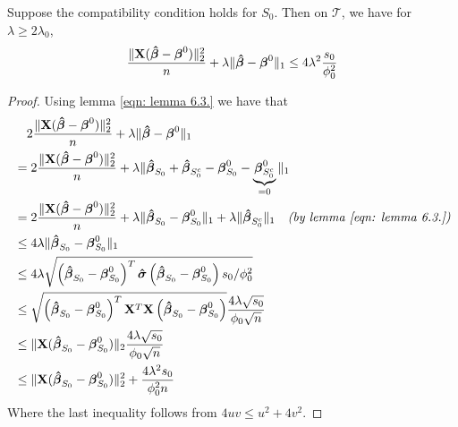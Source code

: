 \begin{theorem}[Theorem 6.1.]
    Suppose the compatibility condition holds for $S_{0}$. Then on $\mathscr{T}$, we have for $\lambda \geq 2 \lambda_{0}$,
    $$
        \frac{\|\mathbf{X}(\boldsymbol{\hat{\beta}}-\boldsymbol{\beta}^{0})\|_{2}^{2}}{n}+\lambda\|\boldsymbol{\hat{\beta}}-\boldsymbol{\beta}^{0}\|_{1} \leq 4 \lambda^{2} \frac{s_{0}}{\phi_{0}^{2}}
    $$
\end{theorem}
\begin{proof}
    Using lemma \ref{eqn: lemma 6.3.} we have that
    \begin{align*}
         & \quad 2 \frac{\|\mathbf{X}(\boldsymbol{\hat{\beta}}-\boldsymbol{\beta}^{0})\|_{2}^{2}}{n} + \lambda\|\boldsymbol{\hat{\beta}}-\boldsymbol{\beta}^{0}\|_{1}                                                                                                    \\
         & = 2 \frac{\|\mathbf{X}(\boldsymbol{\hat{\beta}}-\boldsymbol{\beta}^{0})\|_{2}^{2}}{n} + \lambda \| \boldsymbol{\hat{\beta}}_{S_0} + \boldsymbol{\hat{\beta}}_{S_{0}^{c}} - \boldsymbol{\beta}^{0}_{S_0} - \underbrace{\boldsymbol{\beta}^{0}_{S_0^c}}_{=0} \|_{1}                            \\
         & = 2 \frac{\|\mathbf{X}(\boldsymbol{\hat{\beta}}-\boldsymbol{\beta}^{0})\|_{2}^{2}}{n} + \lambda \| \boldsymbol{\hat{\beta}}_{S_0} - \boldsymbol{\beta}^{0}_{S_0} \|_{1} + \lambda \| \boldsymbol{\hat{\beta}}_{S_{0}^{c}} \|_1 \quad \textit{(by lemma \ref{eqn: lemma 6.3.})} \\
         & \leq 4 \lambda \|\boldsymbol{\hat{\beta}}_{S_{0}} - \boldsymbol{\beta}_{S_{0}}^{0} \|_{1}                                                                                                                                      \\
         & \leq 4 \lambda \sqrt{\left( \boldsymbol{\hat{\beta}}_{S_{0}} - \boldsymbol{\beta}_{S_{0}}^{0} \right)^{T} \boldsymbol{\hat{\sigma}} \left( \boldsymbol{\hat{\beta}}_{S_{0}} - \boldsymbol{\beta}_{S_{0}}^{0}  \right) s_{0} / \phi_{0}^{2}}                                     \\
         & \leq \sqrt{\left( \boldsymbol{\hat{\beta}}_{S_{0}} - \boldsymbol{\beta}_{S_{0}}^{0} \right)^{T} \mathbf{X}^T \mathbf{X} \left( \boldsymbol{\hat{\beta}}_{S_{0}} - \boldsymbol{\beta}_{S_{0}}^{0}  \right)} \frac{4 \lambda \sqrt{s_{0}}}{\phi_{0} \sqrt{n}}                   \\
         & \leq \| \mathbf{X} ( \boldsymbol{\hat{\beta}}_{S_{0}} - \boldsymbol{\beta}_{S_{0}}^{0} ) \|_2 \frac{4 \lambda \sqrt{s_{0}}}{\phi_{0} \sqrt{n}}                                                                                         \\
         & \leq \| \mathbf{X} ( \boldsymbol{\hat{\beta}}_{S_{0}} - \boldsymbol{\beta}_{S_{0}}^{0} ) \|^2_2 + \frac{4 \lambda^2 s_{0}}{\phi^2_{0} n}                                                                                               \\
    \end{align*}
    Where the last inequality follows from $4uv \leq u^2 + 4v^2$.
\end{proof}


